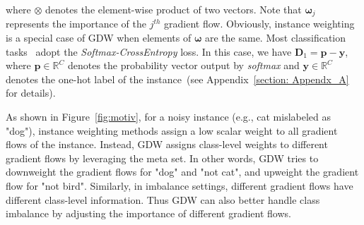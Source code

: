 where $\otimes$ denotes the element-wise product of two vectors.
%
Note that $\boldsymbol \omega_j$ represents the importance of the $j^{th}$ gradient flow.
%
Obviously, instance weighting is a special case of GDW when elements of $\boldsymbol \omega$ are the same.
%
Most classification tasks~\cite{howardMobileNetsEfficientConvolutional2017a,qinRethinkingSoftmaxCrossEntropy2020a,zhaoBetterAccuracyefficiencyTradeoffs2021a} adopt the \textit{Softmax-CrossEntropy} loss.
%
In this case, we have $\mathbf{D}_1 = \mathbf p - \mathbf y$, where $\mathbf p \in \mathbb{R}^C$ denotes the probability vector output by \textit{softmax} and $\mathbf y\in\mathbb{R}^C$ denotes the one-hot label of the instance~(see Appendix~\ref{section: Appendx_A} for details).

%
As shown in Figure~\ref{fig:motiv}, for a noisy instance (e.g., cat mislabeled as "dog"), instance weighting
methods assign a low scalar weight to all gradient flows of the instance.
%
Instead, GDW assigns class-level weights to different gradient flows by leveraging the meta set.
%
In other words, GDW tries to downweight the gradient flows for "dog" and "not cat", and upweight the gradient flow for "not bird".
%
Similarly, in imbalance settings, different gradient flows have different class-level information.
%
Thus GDW can also better handle class imbalance by adjusting the importance of different gradient flows. 

